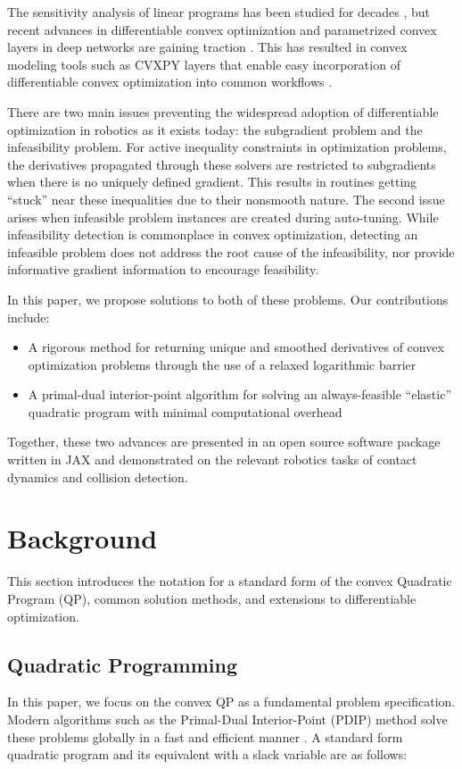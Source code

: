 The sensitivity analysis of linear programs has been studied for decades \cite{boyd2004}, but recent advances in differentiable convex optimization and parametrized convex layers in deep networks are gaining traction \cite{amos2019,agrawal2019a,agrawal2019}. This has resulted in convex modeling tools such as CVXPY layers that enable easy incorporation of differentiable convex optimization into common workflows \cite{diamond}. 

There are two main issues preventing the widespread adoption of differentiable optimization in robotics as it exists today: the subgradient problem and the infeasibility problem. For active inequality constraints in optimization problems, the derivatives propagated through these solvers are restricted to subgradients when there is no uniquely defined gradient. This results in routines getting ``stuck'' near these inequalities due to their nonsmooth nature. The second issue arises when infeasible problem instances are created during auto-tuning. While infeasibility detection is commonplace in convex optimization, detecting an infeasible problem does not address the root cause of the infeasibility, nor provide informative gradient information to encourage feasibility. 

In this paper, we propose solutions to both of these problems. Our contributions include:
\begin{itemize}
    \item A rigorous method for returning unique and smoothed derivatives of convex optimization problems through the use of a relaxed logarithmic barrier 
    \item A primal-dual interior-point algorithm for solving an always-feasible ``elastic'' quadratic program with minimal computational overhead
\end{itemize}
Together, these two advances are presented in an open source software package written in JAX and demonstrated on the relevant robotics tasks of contact dynamics and collision detection. 
%
%
\section{Background}
%
%
%
%
This section introduces the notation for a standard form of the convex Quadratic Program (QP), common solution methods, and extensions to differentiable optimization.
\subsection{Quadratic Programming}
In this paper, we focus on the convex QP as a fundamental problem specification. Modern algorithms such as the Primal-Dual Interior-Point (PDIP) method solve these problems globally in a fast and efficient manner \cite{mattingley2012}. A standard form quadratic program and its equivalent with a slack variable are as follows:

